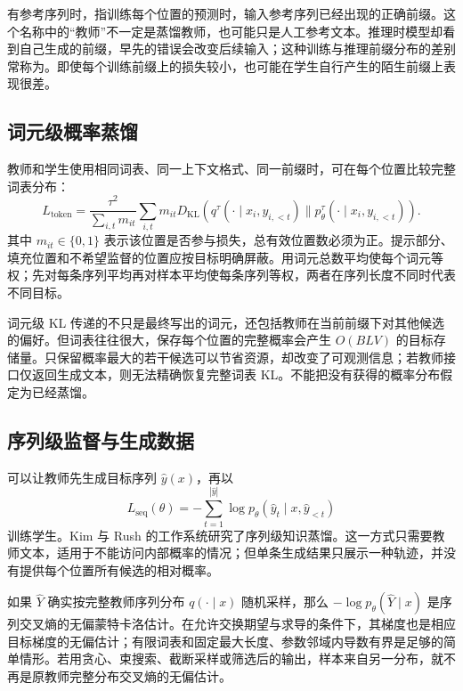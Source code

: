 \documentclass[UTF8,12pt,a4paper,fontset=fandol]{ctexart}
\begin{document}
有参考序列时，指训练每个位置的预测时，输入参考序列已经出现的正确前缀。这个名称中的“教师”不一定是蒸馏教师，也可能只是人工参考文本。推理时模型却看到自己生成的前缀，早先的错误会改变后续输入；这种训练与推理前缀分布的差别常称为。即使每个训练前缀上的损失较小，也可能在学生自行产生的陌生前缀上表现很差。

\subsection{词元级概率蒸馏}
教师和学生使用相同词表、同一上下文格式、同一前缀时，可在每个位置比较完整词表分布：
\begin{equation}
 L_{\mathrm{token}}=\frac{\tau^2}{\sum_{i,t}m_{it}}
 \sum_{i,t}m_{it}D_{\mathrm{KL}}\left(
 q^\tau(\cdot\mid x_i,y_{i,<t})\|
 p_\theta^\tau(\cdot\mid x_i,y_{i,<t})\right).
 \label{eq:kd-token-loss}
\end{equation}
其中 $m_{it}\in\{0,1\}$ 表示该位置是否参与损失，总有效位置数必须为正。提示部分、填充位置和不希望监督的位置应按目标明确屏蔽。用词元总数平均使每个词元等权；先对每条序列平均再对样本平均使每条序列等权，两者在序列长度不同时代表不同目标。

词元级 KL 传递的不只是最终写出的词元，还包括教师在当前前缀下对其他候选的偏好。但词表往往很大，保存每个位置的完整概率会产生 $O(BLV)$ 的目标存储量。只保留概率最大的若干候选可以节省资源，却改变了可观测信息；若教师接口仅返回生成文本，则无法精确恢复完整词表 KL。不能把没有获得的概率分布假定为已经蒸馏。

\subsection{序列级监督与生成数据}
可以让教师先生成目标序列 $\widehat y(x)$，再以
\begin{equation}
 L_{\mathrm{seq}}(\theta)=-\sum_{t=1}^{|\widehat y|}
 \log p_\theta(\widehat y_t\mid x,\widehat y_{<t})
 \label{eq:kd-sequence-loss}
\end{equation}
训练学生。Kim 与 Rush 的工作系统研究了序列级知识蒸馏\cite{kim2016}。这一方式只需要教师文本，适用于不能访问内部概率的情况；但单条生成结果只展示一种轨迹，并没有提供每个位置所有候选的相对概率。

如果 $\widehat Y$ 确实按完整教师序列分布 $q(\cdot\mid x)$ 随机采样，那么 $-\log p_\theta(\widehat Y\mid x)$ 是序列交叉熵的无偏蒙特卡洛估计。在允许交换期望与求导的条件下，其梯度也是相应目标梯度的无偏估计；有限词表和固定最大长度、参数邻域内导数有界是足够的简单情形。若用贪心、束搜索、截断采样或筛选后的输出，样本来自另一分布，就不再是原教师完整分布交叉熵的无偏估计。
\end{document}
